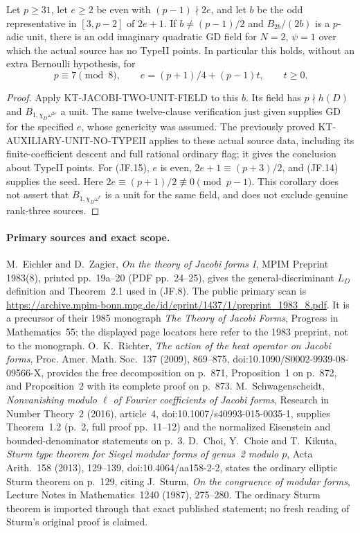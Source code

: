 \begin{corollary}
Let $p\geq31$, let $e\geq2$ be even with $(p-1)\nmid2e$,
and let $b$ be the odd representative in $[3,p-2]$ of $2e+1$.
If $b\ne(p-1)/2$ and $B_{2b}/(2b)$ is a $p$-adic unit,
there is an odd imaginary quadratic GD field for $N=2$, $\psi=1$
over which the actual source has no TypeII points.
In particular this holds, without an extra Bernoulli hypothesis, for
\[
 p\equiv7\pmod8,\qquad
                e=(p+1)/4+(p-1)t,\qquad t\geq0.        \tag{JF.15}
\]
\end{corollary}
\begin{proof}
Apply KT-JACOBI-TWO-UNIT-FIELD to this $b$.  Its field has
$p\nmid h(D)$ and $B_{1,\chi_D\omega^{2e}}$ a unit.
The same twelve-clause verification just given supplies GD for
the specified $e$, whose genericity was assumed.  The previously
proved KT-AUXILIARY-UNIT-NO-TYPEII applies to these actual source
data, including its finite-coefficient descent and full rational
ordinary flag; it gives the conclusion about TypeII points.
For (JF.15), $e$ is even, $2e+1\equiv(p+3)/2$, and (JF.14)
supplies the seed.  Here $2e\equiv(p+1)/2\not\equiv0\pmod{p-1}$.
This corollary does not assert that $B_{1,\chi_D\omega^e}$ is a
unit for the same field, and does not exclude genuine rank-three
sources.
\end{proof}

\paragraph{Primary sources and exact scope.}
M.~Eichler and D.~Zagier, \emph{On the theory of Jacobi forms I},
MPIM Preprint 1983(8), printed pp.~19a--20 (PDF pp.~24--25),
gives the general-discriminant $L_D$ definition and Theorem~2.1
used in (JF.8).  The public primary scan is
\url{https://archive.mpim-bonn.mpg.de/id/eprint/1437/1/preprint_1983_8.pdf}.
It is a precursor of their 1985 monograph \emph{The Theory of Jacobi
Forms}, Progress in Mathematics~55; the displayed page locators here
refer to the 1983 preprint, not to the monograph.
O.~K.~Richter, \emph{The action of the heat operator on Jacobi forms},
Proc. Amer. Math. Soc.~137 (2009), 869--875,
doi:10.1090/S0002-9939-08-09566-X, provides the free decomposition
on p.~871, Proposition~1 on p.~872, and Proposition~2 with its
complete proof on p.~873.
M.~Schwagenscheidt, \emph{Nonvanishing modulo $\ell$ of Fourier
coefficients of Jacobi forms}, Research in Number Theory~2 (2016),
article~4, doi:10.1007/s40993-015-0035-1, supplies Theorem~1.2
(p.~2, full proof pp.~11--12) and the normalized Eisenstein and
bounded-denominator statements on p.~3.
D.~Choi, Y.~Choie and T.~Kikuta, \emph{Sturm type theorem for
Siegel modular forms of genus~2 modulo $p$}, Acta Arith.~158
(2013), 129--139, doi:10.4064/aa158-2-2, states the ordinary
elliptic Sturm theorem on p.~129, citing J.~Sturm,
\emph{On the congruence of modular forms}, Lecture Notes in
Mathematics~1240 (1987), 275--280.  The ordinary Sturm theorem is
imported through that exact published statement; no fresh reading
of Sturm's original proof is claimed.
